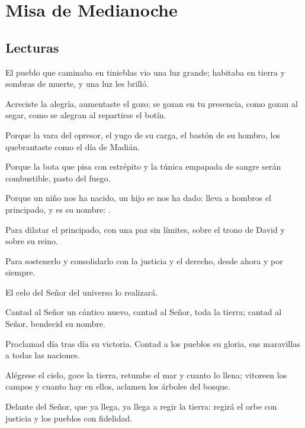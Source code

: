 \chapter{Misa de Medianoche}

\section{Lecturas}


 


\begin{scripture}
	\begin{readprose}
		El pueblo que caminaba en tinieblas vio una luz grande; habitaba en tierra y sombras de muerte, y una luz les brilló.
		
		Acreciste la alegría, aumentaste el gozo; 
		se gozan en tu presencia, como gozan al segar,
		como se alegran al repartirse el botín.
		
		Porque la vara del opresor, el yugo de su carga,
		el bastón de su hombro,
		los quebrantaste como el día de Madián.
		
		Porque la bota que pisa con estrépito
		y la túnica empapada de sangre	
		serán combustible, pasto del fuego.
		
		Porque un niño nos ha nacido, un hijo se nos ha dado:
		lleva a hombros el principado, y es su nombre:	
		.
		
		Para dilatar el principado, con una paz sin límites,	
		sobre el trono de David y sobre su reino.
		
		Para sostenerlo y consolidarlo
		con la justicia y el derecho, desde ahora y por siempre.
		
		El celo del Señor del universo lo realizará.
	\end{readprose}
\end{scripture}


 


\begin{psbody}
	Cantad al Señor un cántico nuevo,
	cantad al Señor, toda la tierra;
	cantad al Señor, bendecid su nombre. 
	
	Proclamad día tras día su victoria.
	Contad a los pueblos su gloria,
	sus maravillas a todas las naciones.
	
	Alégrese el cielo, goce la tierra,
	retumbe el mar y cuanto lo llena;
	vitoreen los campos y cuanto hay en ellos,
	aclamen los árboles del bosque.
	
	Delante del Señor, que ya llega,
	ya llega a regir la tierra:
	regirá el orbe con justicia
	y los pueblos con fidelidad.
\end{psbody}


